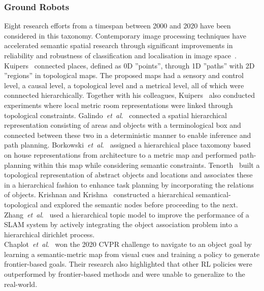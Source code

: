 \documentclass[twocolumn,letterpaper]{IEEEAerospaceCLS}  %
\newcommand{\abbreviation}[1]{\emph{#1}.}
\newcommand{\etal}{\abbreviation{et~al}}
\begin{document}
\subsubsection{Ground Robots} \label{sssec:ResLitCont}
Eight research efforts from a timespan between 2000 and 2020 have been considered in this taxonomy. Contemporary image processing techniques have accelerated semantic spatial research through significant improvements in reliability and robustness of classification and localisation in image space~\cite{alom_history_2018}.\\
Kuipers~\cite{kuipers_spatial_2000} connected places, defined as 0D ''points'', through 1D ''paths'' with 2D ''regions'' in topological maps. The proposed maps had a sensory and control level, a causal level, a topological level and a metrical level, all of which were connnected hierarchically. Together with his colleagues, Kuipers~\cite{kuipers_local_2004} also conducted experiments where local metric room representations were linked through topological constraints. Galindo~\etal~\cite{galindo_robot_2008} connected a spatial hierarchical representation consisting of areas and objects with a terminological box and connected between these two in a deterministic manner to enable inference and path planning. Borkowski~\etal~\cite{borkowski_towards_2010} assigned a hierarchical place taxomony based on house representations from architecture to a metric map and performed path-planning within this map while considering semantic constraints. Tenorth~\cite{tenorth_knowrob-map_2010} built a topological representation of abstract objects and locations and associates these in a hierarchical fashion to enhance task planning by incorporating the relations of objects. Krishnan and Krishna~\cite{krishnan_visual_2010} constructed a hierarchical semantical-topological and explored the semantic nodes before proceeding to the next. Zhang~\etal~\cite{zhang_hierarchical_2019} used a hierarchical topic model to improve the performance of a SLAM system by actively integrating the object association problem into a hierarchical dirichlet process.\\
Chaplot~\etal~\cite{chaplot_object_2020} won the 2020 CVPR challenge to navigate to an object goal by learning a semantic-metric map from visual cues and training a policy to generate frontier-based goals. Their research also highlighted that other RL policies were outperformed by frontier-based methods and were unable to generalize to the real-world.
\end{document}
